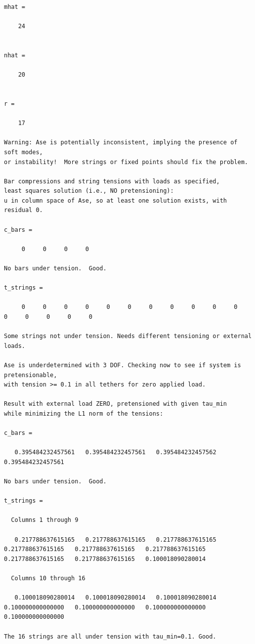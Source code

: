 \documentclass{article}
\begin{document}
\begin{lstlisting}[caption={Ouput of NonminimalPrism4.m with equal tensions across vertical and diagonal strings},captionpos=t, label={lst:p2b}]
mhat =

    24


nhat =

    20


r =

    17

Warning: Ase is potentially inconsistent, implying the presence of soft modes,
or instability!  More strings or fixed points should fix the problem.

Bar compressions and string tensions with loads as specified,
least squares solution (i.e., NO pretensioning):
u in column space of Ase, so at least one solution exists, with residual 0.

c_bars =

     0     0     0     0

No bars under tension.  Good.

t_strings =

     0     0     0     0     0     0     0     0     0     0     0     0     0     0     0     0

Some strings not under tension. Needs different tensioning or external loads.

Ase is underdetermined with 3 DOF. Checking now to see if system is pretensionable,
with tension >= 0.1 in all tethers for zero applied load.

Result with external load ZERO, pretensioned with given tau_min
while minimizing the L1 norm of the tensions:

c_bars =

   0.395484232457561   0.395484232457561   0.395484232457562   0.395484232457561

No bars under tension.  Good.

t_strings =

  Columns 1 through 9

   0.217788637615165   0.217788637615165   0.217788637615165   0.217788637615165   0.217788637615165   0.217788637615165   0.217788637615165   0.217788637615165   0.100018090280014

  Columns 10 through 16

   0.100018090280014   0.100018090280014   0.100018090280014   0.100000000000000   0.100000000000000   0.100000000000000   0.100000000000000

The 16 strings are all under tension with tau_min=0.1. Good.


\end{lstlisting}
\end{document}
